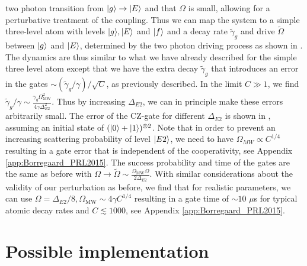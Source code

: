 two photon transition from $| g \rangle\to| E \rangle$ and that $\Omega$ is small,
allowing for a perturbative treatment of the coupling. Thus we can map
the system to a simple three-level atom with levels $| g \rangle,| E \rangle$ and
$| f \rangle$ and a decay rate $\tilde{\gamma}_{g}$ and drive $\tilde{\Omega}$
between $| g \rangle$ and $| E \rangle$, determined by the two photon driving process as
shown in . The dynamics are thus similar to what we have
already described for the simple three level atom except that we have the extra
decay $\tilde{\gamma}_{g}$ that introduces an error in the gates
$\sim(\tilde{\gamma}_{g}/\gamma)/\sqrt{C}$, as previously described. In the
limit $C\gg1$, we find
$\tilde{\gamma}_{g}/\gamma\sim\frac{\gamma_{g}\Omega_{\text{MW}}^{2}}{4\gamma\Delta_{E2}^{2}}$.
Thus by increasing $\Delta_{E2}$, we can in principle make these errors
arbitrarily small. The error of the CZ-gate for different $\Delta_{E2}$ is shown
in , assuming an initial state of
$(| 0 \rangle+| 1 \rangle)^{\otimes 2}$. Note that in order to prevent an increasing
scattering probability of level $| E2 \rangle$, we need to have $\Omega_{MW}\propto
C^{1/4}$ resulting in a gate error that is independent of the cooperativity, see
Appendix \ref{app:Borregaard_PRL2015}.
The success probability and time of the gates are the same as before with
$\Omega\to\tilde{\Omega}\sim\frac{\Omega_{\text{MW}}\Omega}{2\Delta_{E2}}$. With
similar considerations about the validity of our perturbation as
before, we find that for realistic parameters, we can use $\Omega=\Delta_{E2}/8,
\Omega_{\text{MW}}\sim4\gamma C^{1/4}$ resulting in a gate time of $\sim10$
$\mu$s for typical atomic decay rates and $C\lesssim1000$, see Appendix
\ref{app:Borregaard_PRL2015}.

\section{Possible implementation}

